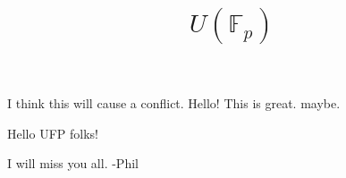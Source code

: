 \documentclass{amsart}
\begin{document}
I think this will cause a conflict. 
 Hello! This is great. maybe. 


    \title{$U(\mathbb{F}_p)$}



    \maketitle

 Hello UFP folks!
 
 I will miss you all. -Phil
\end{document}
